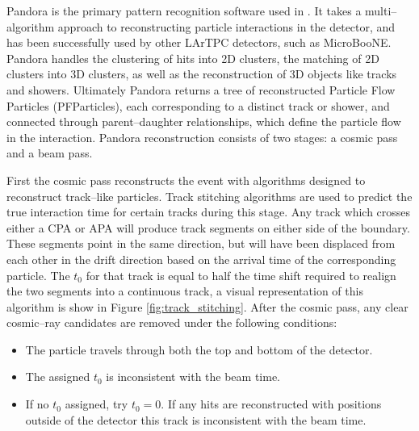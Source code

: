 Pandora\cite{Marshall2015} is the primary pattern recognition software used in
\protodune{}. It takes a multi--algorithm approach to reconstructing particle
interactions in the detector, and has been successfully used by other LArTPC
detectors, such as MicroBooNE\cite{Acciarri:2017hat}. Pandora handles the 
clustering of hits into 2D clusters, the matching of 2D clusters into 3D
clusters, as well as the reconstruction of 3D objects like tracks and 
showers. Ultimately Pandora returns a tree of reconstructed Particle Flow
Particles (PFParticles), each corresponding to a distinct track or shower, and 
connected through parent--daughter relationships, which define the particle flow
in the interaction. Pandora reconstruction consists of two stages: a cosmic 
pass and a beam pass. 


First the cosmic pass reconstructs the event with algorithms designed to 
reconstruct track--like particles. Track stitching algorithms are used to
predict the true interaction time for certain tracks during this stage. Any 
track which crosses either a CPA or APA will produce track segments on either 
side of the boundary. These segments point in the same direction, but will 
have been displaced from each other in the drift direction based on the 
arrival time of the corresponding particle. The $t_0$ for that track is equal 
to half the time shift required to realign the two segments into a continuous 
track, a visual representation of this algorithm is show in Figure 
\ref{fig:track_stitching}.  After the cosmic pass, any clear cosmic--ray 
candidates are removed under the following conditions\cite{protoduneperf}:
\begin{itemize}
	\item The particle travels through both the top and bottom of the detector.
	\item The assigned $t_0$ is inconsistent with the beam time.
	\item If no $t_0$ assigned, try $t_0 = 0$. If any hits are reconstructed 
		with positions outside of the detector this track is inconsistent with the 
		beam time.
\end{itemize}

